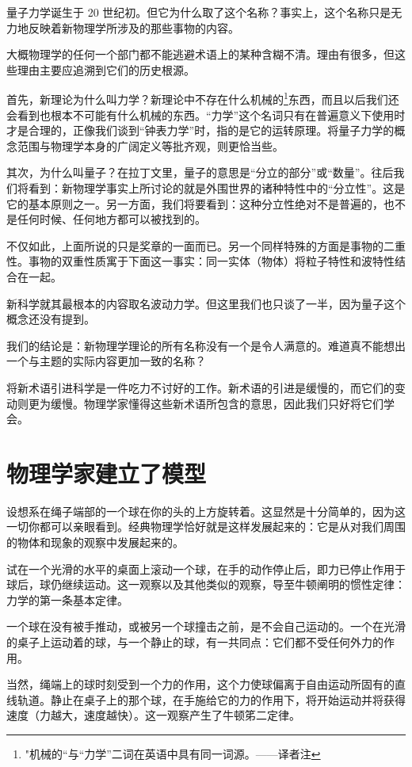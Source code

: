 量子力学诞生于 20 世纪初。但它为什么取了这个名称？事实上，这个名称只是无力地反映着新物理学所涉及的那些事物的内容。

大概物理学的任何一个部门都不能逃避术语上的某种含糊不清。理由有很多，但这些理由主要应追溯到它们的历史根源。

首先，新理论为什么叫力学？新理论中不存在什么机械的\footnote{"机械的“与“力学”二词在英语中具有同一词源。——译者注}东西，而且以后我们还会看到也根本不可能有什么机械的东西。“力学”这个名词只有在普遍意义下使用时才是合理的，正像我们谈到“钟表力学”时，指的是它的运转原理。将量子力学的概念范围与物理学本身的广阔定义等批齐观，则更恰当些。

其次，为什么叫量子？在拉丁文里，量子的意思是“分立的部分”或“数量”。往后我们将看到：新物理学事实上所讨论的就是外围世界的诸种特性中的“分立性”。这是它的基本原则之一。另一方面，我们将要看到：这种分立性绝对不是普遍的，也不是任何时候、任何地方都可以被找到的。

不仅如此，上面所说的只是奖章的一面而已。另一个同样特殊的方面是事物的二重性。事物的双重性质寓于下面这一事实：同一实体（物体）将粒子特性和波特性结合在一起。

新科学就其最根本的内容取名波动力学。但这里我们也只谈了一半，因为量子这个概念还没有提到。

我们的结论是：新物理学理论的所有名称没有一个是令人满意的。难道真不能想出一个与主题的实际内容更加一致的名称？

将新术语引进科学是一件吃力不讨好的工作。新术语的引进是缓慢的，而它们的变动则更为缓慢。物理学家懂得这些新术语所包含的意思，因此我们只好将它们学会。

\section{物理学家建立了模型}

设想系在绳子端部的一个球在你的头的上方旋转着。这显然是十分简单的，因为这一切你都可以亲眼看到。经典物理学恰好就是这样发展起来的：它是从对我们周围的物体和现象的观察中发展起来的。

试在一个光滑的水平的桌面上滚动一个球，在手的动作停止后，即力已停止作用于球后，球仍继续运动。这一观察以及其他类似的观察，导至牛顿阐明的惯性定律：力学的第一条基本定律。

一个球在没有被手推动，或被另一个球撞击之前，是不会自己运动的。一个在光滑的桌子上运动着的球，与一个静止的球，有一共同点：它们都不受任何外力的作用。

当然，绳端上的球时刻受到一个力的作用，这个力使球偏离于自由运动所固有的直线轨道。静止在桌子上的那个球，在手施给它的力的作用下，将开始运动并将获得速度（力越大，速度越快）。这一观察产生了牛顿笫二定律。

